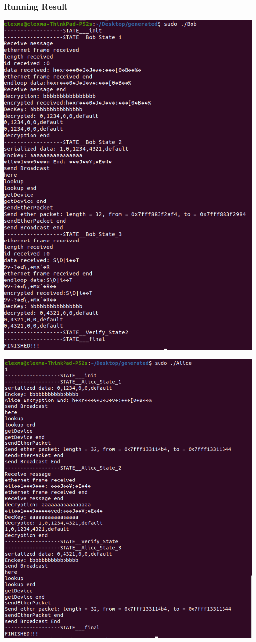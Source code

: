 \documentclass[11pt]{beamer}
\begin{document}
\begin{frame}\frametitle{Running Result}
\begin{multicols}{2}
\begin{center}
\includegraphics[scale=0.25]{bob.png}

\includegraphics[scale=0.25]{alice.png}
\end{center}


\end{multicols}
\end{frame}
\end{document}
